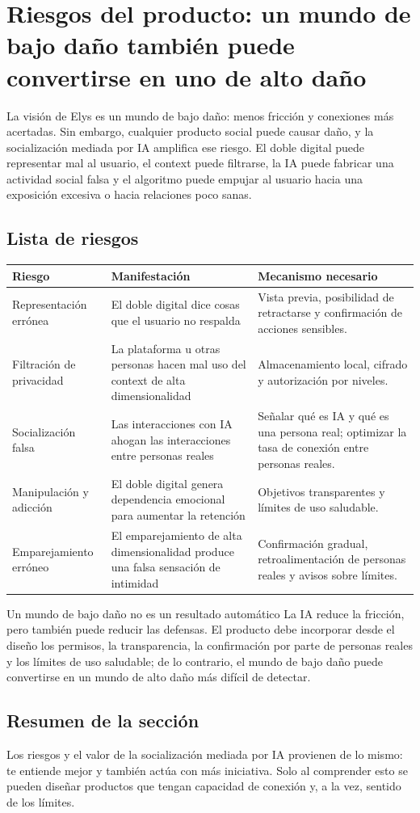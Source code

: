 \section{Riesgos del producto: un mundo de bajo daño también puede convertirse en uno de alto daño}

La visión de Elys es un mundo de bajo daño: menos fricción y conexiones más acertadas. Sin embargo, cualquier producto social puede causar daño, y la socialización mediada por IA amplifica ese riesgo. El doble digital puede representar mal al usuario, el context puede filtrarse, la IA puede fabricar una actividad social falsa y el algoritmo puede empujar al usuario hacia una exposición excesiva o hacia relaciones poco sanas.

\subsection{Lista de riesgos}

\noindent\begin{tabularx}{\textwidth}{p{}p{}X}
\toprule
Riesgo & Manifestación & Mecanismo necesario \\
\midrule
Representación errónea & El doble digital dice cosas que el usuario no respalda & Vista previa, posibilidad de retractarse y confirmación de acciones sensibles. \\
Filtración de privacidad & La plataforma u otras personas hacen mal uso del context de alta dimensionalidad & Almacenamiento local, cifrado y autorización por niveles. \\
Socialización falsa & Las interacciones con IA ahogan las interacciones entre personas reales & Señalar qué es IA y qué es una persona real; optimizar la tasa de conexión entre personas reales. \\
Manipulación y adicción & El doble digital genera dependencia emocional para aumentar la retención & Objetivos transparentes y límites de uso saludable. \\
Emparejamiento erróneo & El emparejamiento de alta dimensionalidad produce una falsa sensación de intimidad & Confirmación gradual, retroalimentación de personas reales y avisos sobre límites. \\
\bottomrule
\end{tabularx}

\begin{warningbox}{Un mundo de bajo daño no es un resultado automático}
La IA reduce la fricción, pero también puede reducir las defensas. El producto debe incorporar desde el diseño los permisos, la transparencia, la confirmación por parte de personas reales y los límites de uso saludable; de lo contrario, el mundo de bajo daño puede convertirse en un mundo de alto daño más difícil de detectar.
\end{warningbox}

\subsection{Resumen de la sección}

Los riesgos y el valor de la socialización mediada por IA provienen de lo mismo: te entiende mejor y también actúa con más iniciativa. Solo al comprender esto se pueden diseñar productos que tengan capacidad de conexión y, a la vez, sentido de los límites.
